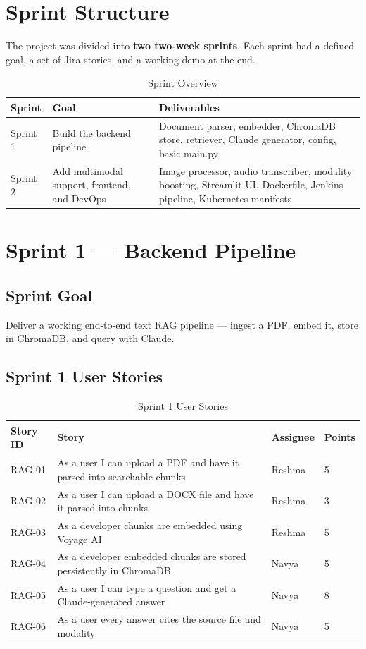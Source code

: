 \documentclass[12pt,a4paper]{report}
\begin{document}
\section{Sprint Structure}

The project was divided into \textbf{two two-week sprints}. Each sprint had a defined goal, a set of Jira stories, and a working demo at the end.

\begin{table}[H]
\centering
\caption{Sprint Overview}
\begin{tabularx}{\textwidth}{p{1.5cm}p{3cm}X}
\toprule
\textbf{Sprint} & \textbf{Goal} & \textbf{Deliverables} \\
\midrule
Sprint 1 & Build the backend pipeline &
Document parser, embedder, ChromaDB store, retriever, Claude generator, config, basic main.py \\
\midrule
Sprint 2 & Add multimodal support, frontend, and DevOps &
Image processor, audio transcriber, modality boosting, Streamlit UI, Dockerfile, Jenkins pipeline, Kubernetes manifests \\
\bottomrule
\end{tabularx}
\end{table}

\section{Sprint 1 --- Backend Pipeline}

\subsection{Sprint Goal}
Deliver a working end-to-end text RAG pipeline --- ingest a PDF, embed it, store in ChromaDB, and query with Claude.

\subsection{Sprint 1 User Stories}

\begin{table}[H]
\centering
\caption{Sprint 1 User Stories}
\begin{tabularx}{\textwidth}{p{1.5cm}Xp{2cm}p{2cm}}
\toprule
\textbf{Story ID} & \textbf{Story} & \textbf{Assignee} & \textbf{Points} \\
\midrule
RAG-01 & As a user I can upload a PDF and have it parsed into searchable chunks & Reshma & 5 \\
RAG-02 & As a user I can upload a DOCX file and have it parsed into chunks & Reshma & 3 \\
RAG-03 & As a developer chunks are embedded using Voyage AI & Reshma & 5 \\
RAG-04 & As a developer embedded chunks are stored persistently in ChromaDB & Navya & 5 \\
RAG-05 & As a user I can type a question and get a Claude-generated answer & Navya & 8 \\
RAG-06 & As a user every answer cites the source file and modality & Navya & 5 \\
\bottomrule
\end{tabularx}
\end{table}
\end{document}
